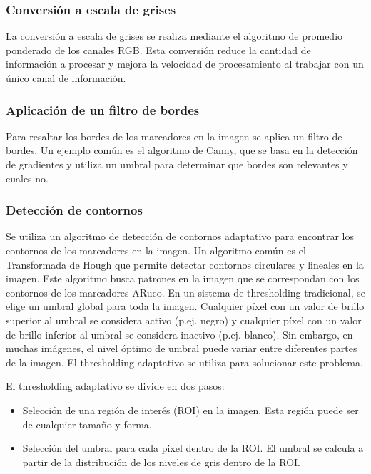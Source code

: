 \subsubsection*{Conversión a escala de grises}
La conversión a escala de grises se realiza mediante el algoritmo de promedio ponderado de los canales RGB. Esta conversión reduce la cantidad de información a procesar y mejora la velocidad de procesamiento al trabajar con un único canal de información.
\subsubsection*{Aplicación de un filtro de bordes}
Para resaltar los bordes de los marcadores en la imagen se aplica un filtro de bordes. Un ejemplo común es el algoritmo de Canny, que se basa en la detección de gradientes y utiliza un umbral para determinar que bordes son relevantes y cuales no.
\subsubsection*{Detección de contornos}
Se utiliza un algoritmo de detección de contornos adaptativo para encontrar los contornos de los marcadores en la imagen. Un algoritmo común es el Transformada de Hough que permite detectar contornos circulares y lineales en la imagen. Este algoritmo busca patrones en la imagen que se correspondan con los contornos de los marcadores ARuco.
En un sistema de thresholding tradicional, se elige un umbral global para toda la imagen. Cualquier píxel con un valor de brillo superior al umbral se considera activo (p.ej. negro) y cualquier píxel con un valor de brillo inferior al umbral se considera inactivo (p.ej. blanco). Sin embargo, en muchas imágenes, el nivel óptimo de umbral puede variar entre diferentes partes de la imagen. El thresholding adaptativo se utiliza para solucionar este problema.

El thresholding adaptativo se divide en dos pasos:
\begin{itemize}
\item Selección de una región de interés (ROI) en la imagen. Esta región puede ser de cualquier tamaño y forma.
\item Selección del umbral para cada pixel dentro de la ROI. El umbral se calcula a partir de la distribución de los niveles de gris dentro de la ROI.
\end{itemize}

